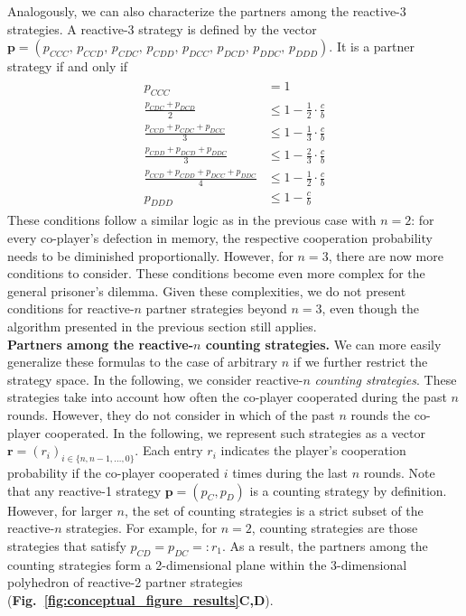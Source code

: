 \documentclass[11pt]{article}
\newcommand{\figref}[1]{{\textbf{Fig.~\ref{#1}}}}
\begin{document}
Analogously, we can also characterize the partners among the reactive-3 strategies. 
A reactive-3 strategy is defined by the vector 
$
\mathbf{p} = (p_{CCC},\, p_{CCD},\, p_{CDC},\, p_{CDD},\, p_{DCC},\, p_{DCD},\, p_{DDC},\, p_{DDD}).
$
It is a partner strategy if and only if
\begin{align}\label{eq:three_bit_conditions}
  \begin{split}
  p_{CCC} & = 1 \\[0.2cm]
  \frac{p_{CDC} + p_{DCD}}{2} & \leq 1 - \frac{1}{2} \cdot \frac{c}{b} \\[0.2cm]
  \frac{p_{CCD} + p_{CDC} + p_{DCC}}{3} & \leq 1 - \frac{1}{3} \cdot \frac{c}{b} \\[0.2cm]
  \frac{p_{CDD} + p_{DCD} + p_{DDC}}{3} & \leq 1 - \frac{2}{3} \cdot \frac{c}{b} \\[0.2cm]
  \frac{p_{CCD} + p_{CDD} + p_{DCC} + p_{DDC}}{4}  & \leq 1 - \frac{1}{2} \cdot \frac{c}{b}  \\[0.2cm]
  p_{DDD} & \leq 1\!-\! \frac{c}{b}
  \end{split}
\end{align}
These conditions follow a similar logic as in the previous case with $n\!=\!2$: 
for every co-player's defection in memory, the respective cooperation probability needs to be diminished proportionally. 
However, for $n\!=\!3$, there are now more conditions to consider. 
These conditions become even more complex for the general prisoner's dilemma. 
Given these complexities, we do not present conditions for reactive-$n$ partner strategies beyond $n\!=\!3$, even though the algorithm presented in the previous section still applies.\\


\noindent
\textbf{Partners among the reactive-$n$ counting strategies.}
We can more easily generalize these formulas to the case of arbitrary $n$ if we further restrict the strategy space. 
In the following, we consider reactive-$n$ {\it counting strategies}. 
These strategies take into account how often the co-player cooperated during the past $n$ rounds. 
However, they do not consider in which of the past $n$ rounds the co-player cooperated. 
In the following, we represent such strategies as a vector $\mathbf{r}\!=\!(r_i)_{i \in \{n, n -1, \dots, 0\}}$. 
Each entry \(r_i\) indicates the player's cooperation probability if the co-player cooperated \(i\) times during the last \(n\) rounds. 
Note that any reactive-1 strategy $\mathbf{p}\!=\!(p_{C}, p_{D})$ is a counting strategy by definition. 
However, for larger $n$, the set of counting strategies is a strict subset of the reactive-$n$ strategies.
For example, for $n\!=\!2$, counting strategies are those strategies that satisfy $p_{CD}\!=\!p_{DC}\!=:\!r_1$. 
As a result, the partners among the counting strategies form a 2-dimensional plane within the 3-dimensional polyhedron of reactive-2 partner strategies (\figref{fig:conceptual_figure_results}\textbf{C,D}).
\end{document}
